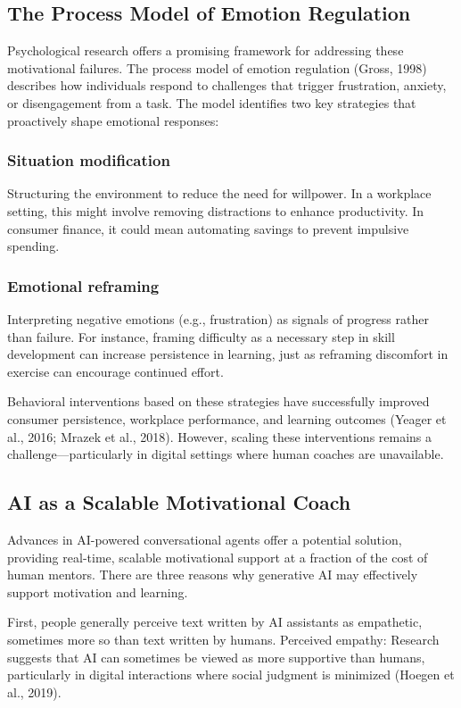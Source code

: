 \documentclass[11pt]{report}
\begin{document}
\begin{mainf}
\subsection{The Process Model of Emotion Regulation}
Psychological research offers a promising framework for addressing these motivational failures. 
The process model of emotion regulation (Gross, 1998) describes how individuals respond to challenges that trigger frustration, anxiety, or disengagement from a task. 
The model identifies two key strategies that proactively shape emotional responses:

\subsubsection{Situation modification} 
Structuring the environment to reduce the need for willpower. 
In a workplace setting, this might involve removing distractions to enhance productivity. 
In consumer finance, it could mean automating savings to prevent impulsive spending.

\subsubsection{Emotional reframing} Interpreting negative emotions (e.g., frustration) as signals of progress rather than failure. 
For instance, framing difficulty as a necessary step in skill development can increase persistence in learning, just as reframing discomfort in exercise can encourage continued effort.

Behavioral interventions based on these strategies have successfully improved consumer persistence, workplace performance, and learning outcomes (Yeager et al., 2016; Mrazek et al., 2018). 
However, scaling these interventions remains a challenge—particularly in digital settings where human coaches are unavailable.

\subsection{AI as a Scalable Motivational Coach}
Advances in AI-powered conversational agents offer a potential solution, providing real-time, scalable motivational support at a fraction of the cost of human mentors. 
There are three reasons why generative AI may effectively support motivation and learning.

First, people generally perceive text written by AI assistants as empathetic, sometimes more so than text written by humans. 
Perceived empathy: Research suggests that AI can sometimes be viewed as more supportive than humans, particularly in digital interactions where social judgment is minimized (Hoegen et al., 2019).


\end{mainf}
\end{document}
